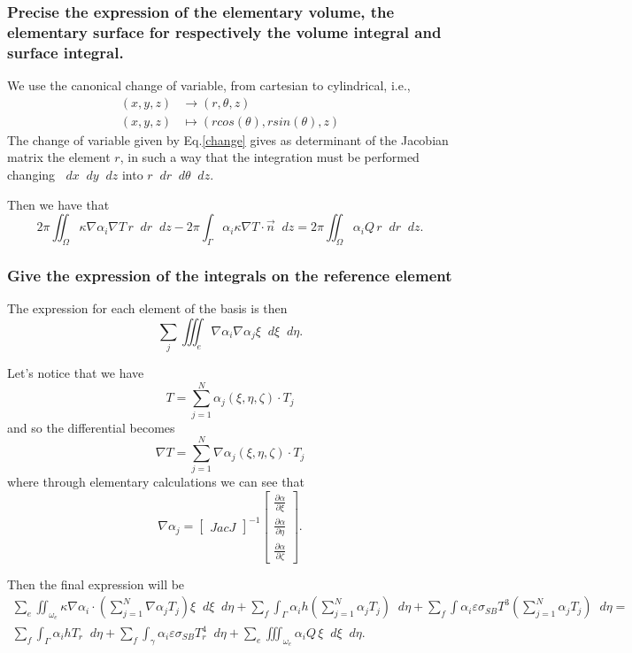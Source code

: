 \documentclass{article}
\newcommand{\diff}{\mathop{}\!d}
\newcommand{\pd}[2]{\frac{\partial #1}{\partial #2}}
\begin{document}
\subsubsection{Precise the expression of the elementary volume, the elementary surface for respectively the volume integral and surface integral.}
We use the canonical change of variable, from cartesian to cylindrical, i.e., \begin{align}\label{change}
(x,y,z)&\to(r,\theta,z)\\
(x,y,z)&\mapsto(rcos(\theta),rsin(\theta),z)\nonumber
\end{align}
The change of variable given by Eq.\ref{change} gives as determinant of the Jacobian matrix the element $ r $, in such a way that the integration must be performed changing $ \diff x\diff y\diff z $ into $ r\diff r\diff\theta\diff z $.

Then we have that 
\[ 2\pi\iint_{\Omega}\kappa\nabla\alpha_i\nabla T\,r\diff r\diff z-2\pi\int_{\Gamma}\alpha_i\kappa\nabla T\cdot\vec{n}\diff z=2\pi\iint_{\Omega}\alpha_i Q\,r\diff r\diff z. \]

\subsubsection{Give the expression of the integrals on the reference element}
The expression for each element of the basis is then
\[\sum_j \iiint_{e}\nabla\alpha_i\nabla\alpha_j\xi\diff\xi\diff\eta. \] 

Let's notice that we have 
\[T=\sum_{j=1}^N\alpha_j(\xi,\eta,\zeta)\cdot T_j \]
and so the differential becomes
\[\nabla T=\sum_{j=1}^N\nabla\alpha_j(\xi,\eta,\zeta)\cdot T_j \]
where through elementary calculations we can see that 
\[\nabla \alpha_j=\begin{bmatrix} Jac J \end{bmatrix}^{-1}\begin{bmatrix}
\pd{\alpha}{\xi}\\\pd{\alpha}{\eta}\\\pd{\alpha}{\zeta} 
\end{bmatrix}. \]

Then the final expression will be
\begin{align*}
\sum_e\iint_{\omega_e}\kappa\nabla\alpha_i\cdot\left(\sum_{j=1}^{N}\nabla\alpha_jT_j \right) \xi\diff\xi\diff\eta +\sum_f\int_{\Gamma}\alpha_ih\left(\sum_{j=1}^{N}\alpha_jT_j\right)\diff \eta +\sum_f\int\alpha_i\varepsilon\sigma_{SB}T^3\left(\sum_{j=1}^{N}\alpha_jT_j \right)\diff \eta=\\
\sum_f\int_{\Gamma}\alpha_ihT_r\diff \eta+\sum_f\int_{\gamma}\alpha_i\varepsilon\sigma_{SB}T_r^4\diff \eta+\sum_e\iiint_{\omega_e}\alpha_iQ\,\xi\diff\xi\diff\eta.
\end{align*}
 
\end{document}
